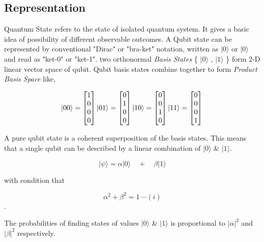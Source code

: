 \subsection{Representation}
Quantum State refers to the state of isolated quantum system. It gives a basic idea of possibility of different observable outcomes. A Qubit state can be represented by conventional "Dirac" or "bra-ket" notation, written as $|0\rangle$ or $|0\rangle$ and read as "ket-0" or "ket-1". two orthonormal \textit{Basis States} \{ $|0\rangle$ , $|1\rangle$ \} form 2-D linear vector space of qubit. Qubit basis states combine together to form \textit{Product Basis Space} like,

\[ |00\rangle = \begin{bmatrix} 1 \\ 0 \\ 0 \\ 0 \end{bmatrix} \quad \\
   |01\rangle = \begin{bmatrix} 0 \\ 1 \\ 0 \\ 0 \end{bmatrix} \quad \\
   |10\rangle = \begin{bmatrix} 0 \\ 0 \\ 1 \\ 0 \end{bmatrix} \quad \\
   |11\rangle = \begin{bmatrix} 0 \\ 0 \\ 0 \\ 1 \end{bmatrix} \quad \\
\]

A pure qubit state is a coherent superposition of the basis states. This means that a single qubit can be described by a linear combination of $|0\rangle$ \& $|1\rangle$.

\[|\psi\rangle = \alpha|0\rangle \quad +\quad \beta|1\rangle\]

with condition that 

\[\alpha^2 + \beta^2 = 1\ \cdots (i) \].

The probabilities of finding states of values $|0\rangle$ \& $|1\rangle$ is proportional to $|\alpha|^2$ and $|\beta|^2$ respectively.\\

